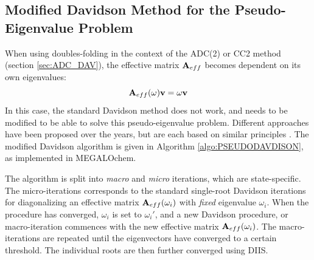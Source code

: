 \subsection{Modified Davidson Method for the Pseudo-Eigenvalue Problem}

When using doubles-folding in the context of the ADC(2) or CC2 method (section \ref{sec:ADC_DAV}), the effective matrix $\mathbf{A}_{eff}$ becomes dependent on its own eigenvalues:
\begin{equation}
\mathbf{A}_{eff}(\omega) \mathbf{v} = \omega \mathbf{v}
\end{equation}
\noindent In this case, the standard Davidson method does not work, and needs to be modified to be able to solve this pseudo-eigenvalue problem. Different approaches have been proposed over the years, but are each based on similar principles \cite{Kat2009,Win2011}. The modified Davidson algorithm is given in Algorithm \ref{algo:PSEUDODAVDISON}, as implemented in MEGALOchem. 

The algorithm is split into \emph{macro} and \emph{micro} iterations, which are state-specific. The micro-iterations corresponds to the standard single-root Davidson iterations for diagonalizing an effective matrix $\mathbf{A}_{eff}(\omega_i)$ with \emph{fixed} eigenvalue $\omega_i$. When the procedure has converged, $\omega_i$ is set to $\omega_i'$, and a new Davidson procedure, or macro-iteration commences with the new effective matrix $\mathbf{A}_{eff}(\omega_i)$. The macro-iterations are repeated until the eigenvectors have converged to a certain threshold. The individual roots are then further converged using DIIS.

